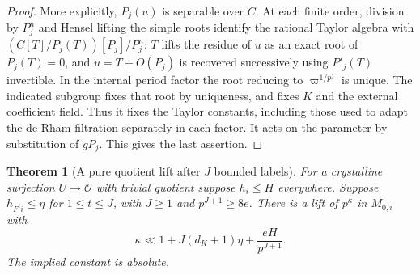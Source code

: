 \documentclass[a4paper,11pt]{article}
\newtheorem{theorem}[proposition]{Theorem}
\theoremstyle{definition}
\theoremstyle{remark}
\numberwithin{equation}{section}
\begin{document}
\begin{proof}
More explicitly, \(P_j(u)\) is separable over \(C\).
At each finite order, division by \(P_j^n\) and Hensel
lifting the simple roots identify the rational Taylor
algebra with \((C[T]/P_j(T))[P_j]/P_j^n\): \(T\) lifts
the residue of \(u\) as an exact root of \(P_j(T)=0\),
and \(u=T+O(P_j)\) is recovered successively using
\(P'_j(T)\) invertible. In the internal period factor
the root reducing to \(\varpi^{1/p^j}\) is unique.
The indicated subgroup fixes that root by uniqueness,
and fixes \(K\) and the external coefficient field.
Thus it fixes the Taylor constants, including those used
to adapt the de Rham filtration separately in each
factor. It acts on the parameter by substitution of
\(gP_j\). This gives the last assertion.
\end{proof}

\begin{theorem}[A pure quotient lift after \(J\) bounded labels]
\leavevmode\label{thm:ramifiedcut782}
For a crystalline surjection \(U\to\mathcal O\) with
trivial quotient suppose \(h_i\le H\) everywhere.
Suppose \(h_{F^t i}\le\eta\) for \(1\le t\le J\), with
\(J\ge1\) and \(p^{J+1}\ge8e\). There is a lift of
\(p^\kappa\) in \(M_{0,i}\) with
\[
 \kappa\ll 1+J(d_K+1)\eta+\frac{eH}{p^{J+1}} .
\]
The implied constant is absolute.
\end{theorem}
\end{document}
